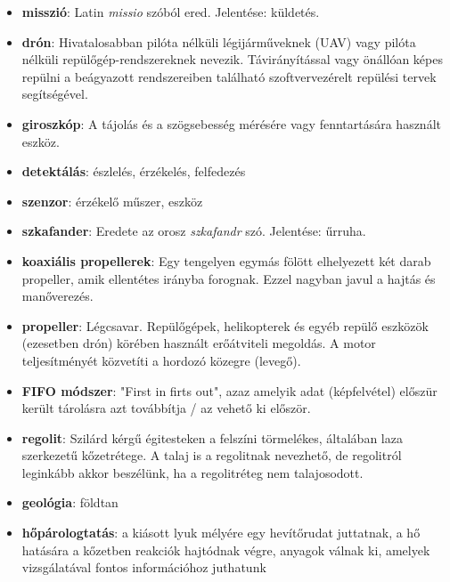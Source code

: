 \documentclass[12pt]{report}
\begin{document}
\begin{itemize}

  \item \textbf{misszió}: Latin \textit{missio} szóból ered. Jelentése: küldetés.
  \item \textbf{drón}: Hivatalosabban pilóta nélküli légijárműveknek (UAV) vagy pilóta nélküli repülőgép-rendszereknek nevezik. Távirányítással vagy önállóan képes repülni a beágyazott rendszereiben található szoftvervezérelt repülési tervek segítségével.
  \item \textbf{giroszkóp}: A tájolás és a szögsebesség mérésére vagy fenntartására használt eszköz.
  \item \textbf{detektálás}: észlelés, érzékelés, felfedezés
  \item \textbf{szenzor}: érzékelő műszer, eszköz
  \item \textbf{szkafander}: Eredete az orosz \textit{szkafandr} szó. Jelentése: űrruha.
  \item \textbf{koaxiális propellerek}: Egy tengelyen egymás fölött elhelyezett két darab propeller, amik ellentétes irányba forognak. Ezzel nagyban javul a hajtás és manőverezés.
  \item \textbf{propeller}: Légcsavar. Repülőgépek, helikopterek és egyéb repülő eszközök (ezesetben drón) körében használt erőátviteli megoldás. A motor teljesítményét közvetíti a hordozó közegre (levegő).
  \item \textbf{FIFO módszer}: "First in firts out", azaz amelyik adat (képfelvétel) előszür került tárolásra azt továbbítja / az vehető ki először.
  \item \textbf{regolit}: Szilárd kérgű égitesteken a felszíni törmelékes, általában laza szerkezetű kőzetrétege. A talaj is a regolitnak nevezhető, de regolitról leginkább akkor beszélünk, ha a regolitréteg nem talajosodott.
  \item \textbf{geológia}: földtan
  \item \textbf{hőpárologtatás}: a kiásott lyuk mélyére egy hevítőrudat juttatnak, a hő hatására a kőzetben reakciók hajtódnak végre, anyagok válnak ki, amelyek vizsgálatával fontos információhoz juthatunk

\end{itemize}
\end{document}
